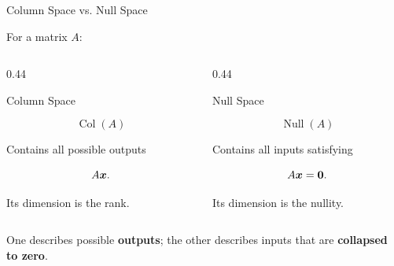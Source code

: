 \begin{frame}{Column Space vs. Null Space}

For a matrix $A$:

\vspace{0.3cm}

\begin{columns}[T,totalwidth=\textwidth]

\begin{column}{0.44\textwidth}

\begin{block}{Column Space}

\[
\operatorname{Col}(A)
\]

Contains all possible outputs

\[
A\bm{x}.
\]

Its dimension is the rank.

\end{block}

\end{column}

\begin{column}{0.44\textwidth}

\begin{block}{Null Space}

\[
\operatorname{Null}(A)
\]

Contains all inputs satisfying

\[
A\bm{x}=\mathbf{0}.
\]

Its dimension is the nullity.

\end{block}

\end{column}

\end{columns}

\vspace{0.4cm}

One describes possible \textbf{outputs}; the other describes
inputs that are \textbf{collapsed to zero}.

\end{frame}



